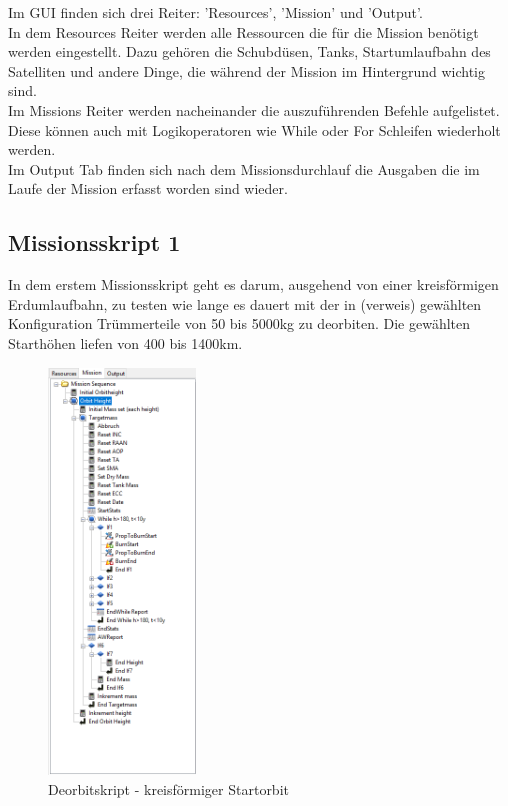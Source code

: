 Im GUI finden sich drei Reiter: ’Resources’, ’Mission’ und ’Output’.\\
In dem Resources Reiter werden alle Ressourcen die für die Mission benötigt werden eingestellt. Dazu gehören die Schubdüsen, Tanks, Startumlaufbahn des Satelliten und andere Dinge, die während der Mission im Hintergrund wichtig sind.\\
Im Missions Reiter werden nacheinander die auszuführenden Befehle aufgelistet. Diese können auch mit Logikoperatoren wie While oder For Schleifen wiederholt werden.\\
Im Output Tab finden sich nach dem Missionsdurchlauf die Ausgaben die im Laufe der Mission erfasst worden sind wieder. 



\subsection{Missionsskript 1}

In dem erstem Missionsskript geht es darum, ausgehend von einer kreisförmigen Erdumlaufbahn, zu testen wie lange es dauert mit der in (verweis) gewählten Konfiguration Trümmerteile von 50 bis 5000kg zu deorbiten. Die gewählten Starthöhen liefen von 400 bis 1400km.\\

\begin{figure}[!h]
	\centering
		\includegraphics[width=0.35\textwidth]{graphics/GMAT/GMAT_Skript3.PNG}
	\caption{Deorbitskript - kreisförmiger Startorbit}
	\label{fig:GMAT_Skript3}
\end{figure}



